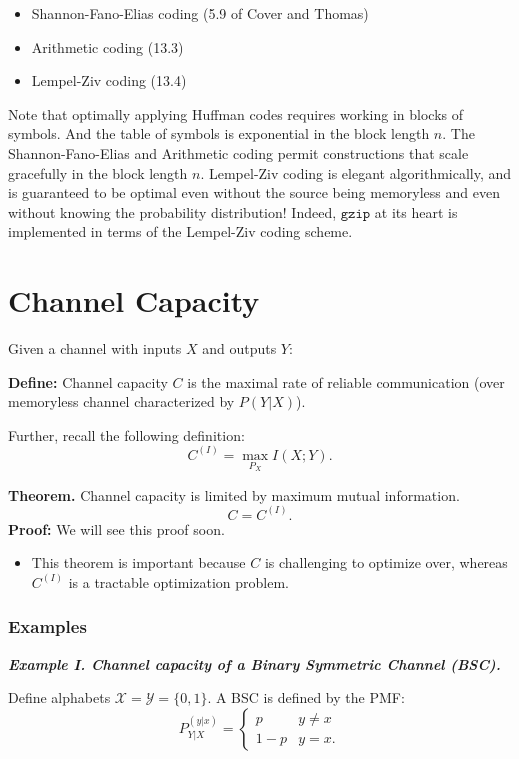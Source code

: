 \begin{itemize}
  \item Shannon-Fano-Elias coding (5.9 of Cover and Thomas)
  \item Arithmetic coding (13.3)
  \item Lempel-Ziv coding (13.4)
\end{itemize}

Note that optimally applying Huffman codes requires working in blocks of symbols.  And the table of symbols is exponential in the block length $n$.  The Shannon-Fano-Elias and Arithmetic coding permit constructions that scale gracefully in the block length $n$.  Lempel-Ziv coding is elegant algorithmically, and is guaranteed to be optimal even without the source being memoryless and even without knowing the probability distribution!  Indeed, $\texttt{gzip}$ at its heart is implemented in terms of the Lempel-Ziv coding scheme.


\section{Channel Capacity}

Given a channel with inputs $X$ and outputs $Y$:

\textbf{Define:} Channel capacity $C$ is the maximal rate of reliable communication (over memoryless channel characterized by $P(Y|X)$).

Further, recall the following definition:
\[
C^{(I)} = \max_{P_X} I(X; Y).
\]

{\bf Theorem.} Channel capacity is limited by maximum mutual information. 
\[
C = C^{(I)}.
\]
\textbf{Proof: } We will see this proof soon. 

\begin{itemize}
\item This theorem is important because $C$ is challenging to optimize over, whereas $C^{(I)}$ is a tractable optimization problem.
\end{itemize}

\subsubsection{Examples}
\textbf{\textit{Example I. Channel capacity of a Binary Symmetric Channel (BSC).}}

Define alphabets $\mathcal{X} = \mathcal{Y} = \{ 0, 1 \}$. A BSC is defined by the PMF:
\[
P_{Y|X}^{(y|x)} = \begin{cases}
p & y \neq x \\ 
1 - p & y = x.
\end{cases}
\]

